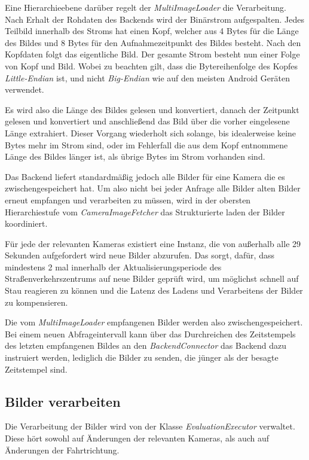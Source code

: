 Eine Hierarchieebene darüber regelt der {\em MultiImageLoader} die Verarbeitung.
Nach Erhalt der Rohdaten des Backends wird der Binärstrom aufgespalten.
Jedes Teilbild innerhalb des Stroms hat einen Kopf, welcher aus 4 Bytes für die Länge des Bildes und 8 Bytes für den Aufnahmezeitpunkt des Bildes besteht.
Nach den Kopfdaten folgt das eigentliche Bild. Der gesamte Strom besteht nun einer Folge von Kopf und Bild. Wobei zu beachten gilt, dass die Bytereihenfolge des Kopfes {\em Little-Endian} ist, und nicht {\em Big-Endian} wie auf den meisten Android Geräten verwendet.

Es wird also die Länge des Bildes gelesen und konvertiert, danach der Zeitpunkt gelesen und konvertiert und anschließend das Bild über die vorher eingelesene Länge extrahiert. Dieser Vorgang wiederholt sich solange, bis idealerweise keine Bytes mehr im Strom sind, oder im Fehlerfall die aus dem Kopf entnommene Länge des Bildes länger ist, als übrige Bytes im Strom vorhanden sind.

Das Backend liefert standardmäßig jedoch alle Bilder für eine Kamera die es zwischengespeichert hat. Um also nicht bei jeder Anfrage alle Bilder alten Bilder erneut empfangen und verarbeiten zu müssen, wird in der obersten Hierarchiestufe vom {\em CameraImageFetcher} das Strukturierte laden der Bilder koordiniert.

Für jede der relevanten Kameras existiert eine Instanz, die von außerhalb alle 29 Sekunden aufgefordert wird neue Bilder abzurufen. Das sorgt, dafür, dass mindestens 2 mal innerhalb der Aktualisierungsperiode des Straßenverkehrszentrums auf neue Bilder geprüft wird, um möglichst schnell auf Stau reagieren zu können und die Latenz des Ladens und Verarbeitens der Bilder zu kompensieren.

Die vom {\em MultiImageLoader} empfangenen Bilder werden also zwischengespeichert. Bei einem neuen Abfrageintervall kann über das Durchreichen des Zeitstempels des letzten empfangenen Bildes an den {\em BackendConnector} das Backend dazu instruiert werden, lediglich die Bilder zu senden, die jünger als der besagte Zeitstempel sind.

\subsection{Bilder verarbeiten}
Die Verarbeitung der Bilder wird von der Klasse {\em EvaluationExecutor} verwaltet.
Diese hört sowohl auf Änderungen der relevanten Kameras, als auch auf Änderungen der Fahrtrichtung.

